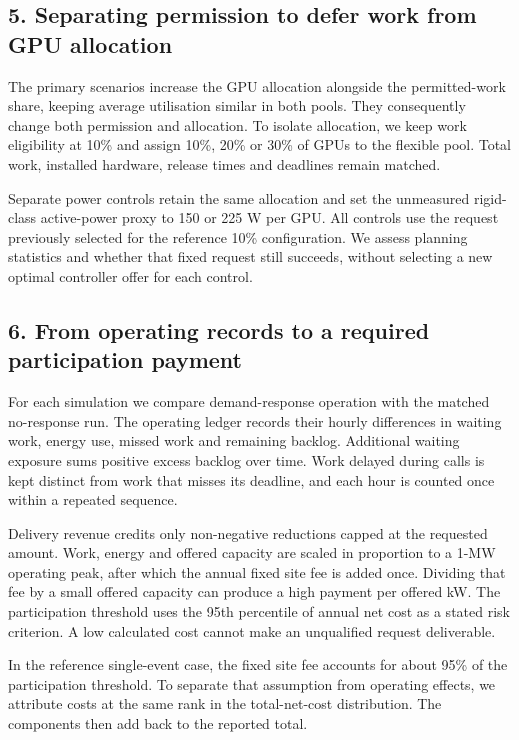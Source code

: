 \documentclass[10pt,a4paper]{article}
\begin{document}
\subsection{5. Separating permission to defer work from GPU allocation}

The primary scenarios increase the GPU allocation alongside the permitted-work share, keeping average utilisation similar in both pools. They consequently change both permission and allocation. To isolate allocation, we keep work eligibility at 10\% and assign 10\%, 20\% or 30\% of GPUs to the flexible pool. Total work, installed hardware, release times and deadlines remain matched.


Separate power controls retain the same allocation and set the unmeasured rigid-class active-power proxy to 150 or 225 W per GPU. All controls use the request previously selected for the reference 10\% configuration. We assess planning statistics and whether that fixed request still succeeds, without selecting a new optimal controller offer for each control.


\subsection{6. From operating records to a required participation payment}

For each simulation we compare demand-response operation with the matched no-response run. The operating ledger records their hourly differences in waiting work, energy use, missed work and remaining backlog. Additional waiting exposure sums positive excess backlog over time. Work delayed during calls is kept distinct from work that misses its deadline, and each hour is counted once within a repeated sequence.


Delivery revenue credits only non-negative reductions capped at the requested amount. Work, energy and offered capacity are scaled in proportion to a 1-MW operating peak, after which the annual fixed site fee is added once. Dividing that fee by a small offered capacity can produce a high payment per offered kW. The participation threshold uses the 95th percentile of annual net cost as a stated risk criterion. A low calculated cost cannot make an unqualified request deliverable.


In the reference single-event case, the fixed site fee accounts for about 95\% of the participation threshold. To separate that assumption from operating effects, we attribute costs at the same rank in the total-net-cost distribution. The components then add back to the reported total.
\end{document}
